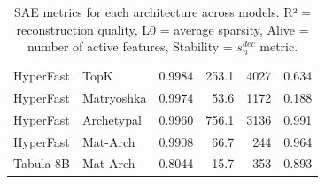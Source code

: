 \begin{table}[h]
\begin{tabular}{llrrrr}
HyperFast & TopK & 0.9984 & 253.1 & 4027 & 0.634 \\
HyperFast & Matryoshka & 0.9974 & 53.6 & 1172 & 0.188 \\
HyperFast & Archetypal & 0.9960 & 756.1 & 3136 & 0.991 \\
HyperFast & Mat-Arch & 0.9908 & 66.7 & 244 & 0.964 \\
\midrule
Tabula-8B & Mat-Arch & 0.8044 & 15.7 & 353 & 0.893 \\
\bottomrule
\end{tabular}
\caption{SAE metrics for each architecture across models. R² = reconstruction quality, L0 = average sparsity, Alive = number of active features, Stability = $s_n^{dec}$ metric.}
\label{tab:sae_metrics}
\end{table}